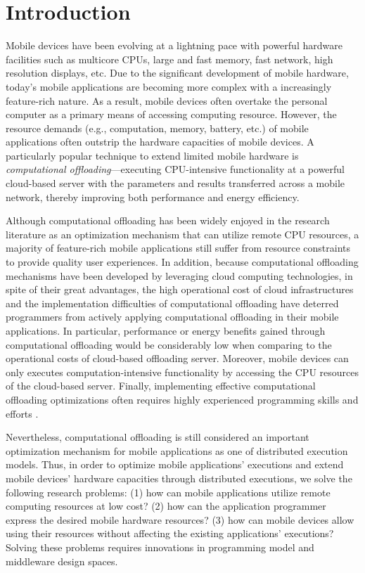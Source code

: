 \documentclass[conference]{IEEEtran}
\begin{document}
\section{Introduction}
Mobile devices have been evolving at a lightning pace with powerful hardware facilities such as multicore CPUs, large and fast memory, fast network, high resolution displays, etc. Due to the significant development of mobile hardware, today's mobile applications are becoming more complex with a increasingly feature-rich nature. As a result, mobile devices often overtake the personal computer as a primary means of accessing computing resource. However, the resource demands (e.g., computation, memory, battery, etc.) of mobile applications often outstrip the hardware capacities of mobile devices. A particularly popular technique to extend limited mobile hardware is \emph{computational offloading}---executing CPU-intensive functionality at a powerful cloud-based server with the parameters and results transferred across a mobile network, thereby improving both performance and energy efficiency. 

Although computational offloading has been widely enjoyed in the research literature as an optimization mechanism that can utilize remote CPU resources, a majority of feature-rich mobile applications still suffer from resource constraints to provide quality user experiences. In addition, because computational offloading mechanisms have been developed by leveraging cloud computing technologies, in spite of their great advantages, the high operational cost of cloud infrastructures and the implementation difficulties of computational offloading have deterred programmers from actively applying computational offloading in their mobile applications. In particular, performance or energy benefits gained through computational offloading would be considerably low when comparing to the operational costs of cloud-based offloading server. Moreover, mobile devices can only executes computation-intensive functionality by accessing the CPU resources of the cloud-based server. Finally, implementing effective computational offloading optimizations often requires highly experienced programming skills and efforts \cite{kwon+:mobilesoft15}.

Nevertheless, computational offloading is still considered an important optimization mechanism for mobile applications as one of distributed execution models. Thus, in order to optimize mobile applications' executions and extend mobile devices' hardware capacities through distributed executions, we solve the following research problems: (1) how can mobile applications utilize remote computing resources at low cost? (2) how can the application programmer express the desired mobile hardware resources? (3) how can mobile devices allow using their resources without affecting the existing applications' executions? Solving these problems requires innovations in programming model and middleware design spaces. 
\end{document}
